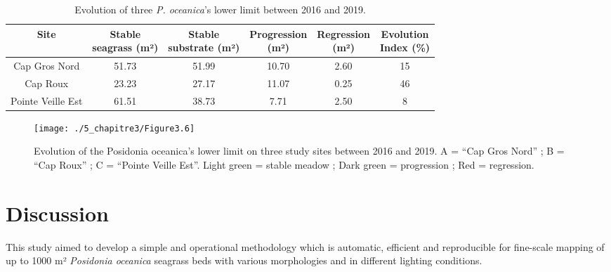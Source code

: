 \begin{table}[htbp]
  \centering
  \normalsize
  \caption[Evolution of three \textit{P. oceanica}’s lower limit between 2016 and 2019.]{Evolution of three \textit{P. oceanica}’s lower limit between 2016 and 2019.}
  \label{table3.3}
    \begin{tabular}{*{6}{c}}
        \toprule
        \textbf{Site} & \makecell{\textbf{Stable} \\ \textbf{seagrass (m²)}} & \makecell{\textbf{Stable} \\ \textbf{substrate (m²)}} & \makecell{\textbf{Progression} \\ \textbf{(m²)}} & \makecell{\textbf{Regression} \\ \textbf{(m²)}} & \makecell{\textbf{Evolution} \\ \textbf{Index (\%)}} \\ \midrule
        Cap   Gros Nord & 51.73 & 51.99 & 10.70 & 2.60 & 15 \\
        Cap   Roux & 23.23 & 27.17 & 11.07 & 0.25 & 46 \\
        Pointe   Veille Est & 61.51 & 38.73 & 7.71 & 2.50 & 8 \\ \bottomrule
    \end{tabular}
\end{table}

\begin{figure}[H]
	\begin{center}
	\texttt{[image: ./5\_chapitre3/Figure3.6]}
		\caption[Evolution of the Posidonia oceanica’s lower limit on three study sites between 2016 and 2019.]{Evolution of the Posidonia oceanica’s lower limit on three study sites between 2016 and 2019. A = “Cap Gros Nord” ; B = “Cap Roux” ; C = “Pointe Veille Est”. Light green = stable meadow ; Dark green = progression ; Red = regression.}
	\label{figure3.6}
\end{center}
\end{figure}

\section{Discussion}\label{chapitre3_4}
This study aimed to develop a simple and operational methodology which is automatic, efficient and reproducible for fine-scale mapping of up to 1000 m² \textit{Posidonia oceanica} seagrass beds with various morphologies and in different lighting conditions.

